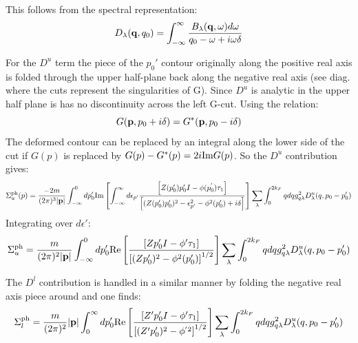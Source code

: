 \documentclass{article}
\def\q{{\bf q}}
\def\p{{\bf p}}
\begin{document}
This follows from the spectral representation:
\begin{equation}
D_{\lambda}(\q,q_{0}) = \int_{-\infty}^{\infty} \frac{B_{\lambda}(\q,\omega)d\omega}{q_{0} - \omega + i\omega\delta}
\end{equation}


For the $D^{u}$ term the piece of the $p_{0}'$ contour originally along the positive real axis is folded
through the upper half-plane back along the negative real axis (see diag. where the cuts represent the singularities
of G). Since $D^{u}$ is analytic in the upper half plane is has no discontinuity across the left G-cut. 
Using the relation:
%
\begin{equation}
G(\p, p_{0} + i\delta) = G^{*}(\p, p_{0}-i\delta)
\end{equation}
%
The deformed contour can be replaced by an integral along the lower side of the 
cut if $G(p)$ is replaced by $G(p)-G^{*}(p) = 2i {\rm Im} G(p)$. So the $D^{u}$
contribution gives:
%
\begin{equation}
\Sigma_{u}^{\rm ph}(p) = \frac{-2m}{(2\pi)^{3}|\p|}\int_{-\infty}^{0} d p'_{0} 
{\rm Im}\left[ \int_{-\infty}^{\infty}d \epsilon_{p'}\frac{\left[Z(p_{0}')p'_{0}I - \phi(p^{'}_{0})\tau_{1} \right]}
{\left[(Z(p_{0}')p_{0}')^{2} - \epsilon_{p'}^{2} - \phi^{2}(p_{0}') + i\delta \right]}\right]
\sum_{\lambda}\int_{0}^{2k_{F}}q dq g^{2}_{q\lambda} D^{u}_{\lambda}(q,p_{0} - p_{0}')
\end{equation}
%
Integrating over $d\epsilon'$:
%
\begin{equation}
\Sigma_{u}^{\rm ph} = \frac{m}{(2\pi)^{2}|\p|}\int_{-\infty}^{0} d p'_{0} 
{\rm Re}\left[\frac{\left[ Zp'_{0}I - \phi'\tau_{1} \right]}
{\left[(Zp_{0}')^{2}-\phi^{2}(p_{0}')\right] ^{1/2}}\right]
\sum_{\lambda}\int_{0}^{2k_{F}}q dq g^{2}_{q\lambda} D^{u}_{\lambda}(q,p_{0} - p_{0}')
\end{equation}
%

The $D^{l}$ contribution is handled in a similar manner by folding the negative real axis
piece around and one finds:
%
\begin{equation}
\Sigma_{l}^{\rm ph} = \frac{m}{(2\pi)^{2}}|\p|\int_{0}^{\infty}dp'_{0} 
{\rm Re}\left[\frac{\left[ Z'p'_{0}I - \phi'\tau_{1} \right]}
{\left[(Z'p_{0}')^{2}-\phi^{'2}\right]^{1/2}}\right]
\sum_{\lambda}\int_{0}^{2k_{F}}q dq g^{2}_{q\lambda} D^{u}_{\lambda}(q,p_{0} - p_{0}')
\end{equation}
%
\end{document}
